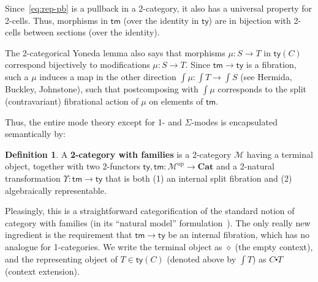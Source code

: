 \documentclass[10pt]{article}
\theoremstyle{definition}
\newtheorem{definition}{Definition}
\newcommand\op{^{\mathrm{op}}}
\newcommand\Cat{\mathbf{Cat}}
\newcommand\M{\mathcal{M}}
\newcommand\Mty{\mathsf{ty}}
\newcommand\Mtm{\mathsf{tm}}
\newcommand\Ups{\Upsilon}
\newcommand\ce{\mathord{\centerdot}}
\newcommand\ec{\diamond}
\begin{document}
\begin{enumerate}
  Since~\eqref{eq:rep-pb} is a pullback in a 2-category, it also has a universal property for 2-cells.
  Thus, morphisms in $\Mtm$ (over the identity in $\Mty$) are in bijection with 2-cells between sections (over the identity).

  The 2-categorical Yoneda lemma also says that morphisms $\mu : S\to T$ in $\Mty(C)$ correspond bijectively to modifications ${\mu}:{S} \to {T}$.
  Since $\Mtm\to\Mty$ is a fibration, such a ${\mu}$ induces a map in the other direction $\int \mu : \int T\to \int S$ (see Hermida, Buckley, Johnstone), such that postcomposing with $\int \mu$ corresponds to the split (contravariant) fibrational action of $\mu$ on elements of $\Mtm$.
\end{enumerate}

Thus, the entire mode theory except for 1- and $\Sigma$-modes is encapsulated semantically by:

\begin{definition}
  A \textbf{2-category with families} is a 2-category $\M$ having a terminal object, together with two 2-functors $\Mty,\Mtm : \M\op\to\Cat$ and a 2-natural transformation $\Ups:\Mtm\to \Mty$ that is both (1) an internal split fibration and (2) algebraically representable.
\end{definition}

Pleasingly, this is a straightforward categorification of the standard notion of category with families (in its ``natural model'' formulation~\cite{awodey:natural-models}).
The only really new ingredient is the requirement that $\Mtm\to \Mty$ be an internal fibration, which has no analogue for 1-categories.
We write the terminal object as $\ec$ (the empty context), and the representing object of $T\in \Mty(C)$ (denoted above by $\int T$) as $C\ce T$ (context extension).
\end{document}
